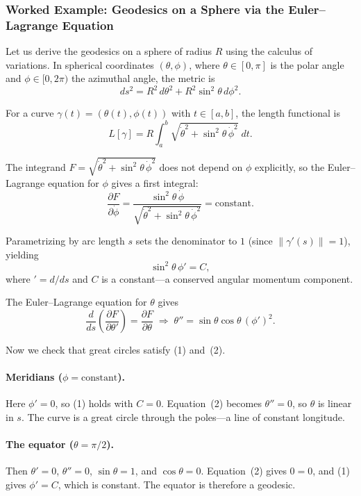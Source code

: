 \subsubsection*{Worked Example: Geodesics on a Sphere via the Euler--Lagrange Equation}

Let us derive the geodesics on a sphere of radius $R$ using the calculus of variations. In spherical coordinates $(\theta,\phi)$, where $\theta\in[0,\pi]$ is the polar angle and $\phi\in[0,2\pi)$ the azimuthal angle, the metric is
\[
ds^2 = R^2\,d\theta^2 + R^2\sin^2\theta\,d\phi^2.
\]

For a curve $\gamma(t)=(\theta(t),\phi(t))$ with $t\in[a,b]$, the length functional is
\[
L[\gamma] = R\int_a^b\sqrt{\dot\theta^2 + \sin^2\theta\,\dot\phi^2}\;dt.
\]

The integrand $F = \sqrt{\dot\theta^2 + \sin^2\theta\,\dot\phi^2}$ does not depend on $\phi$ explicitly, so the Euler--Lagrange equation for $\phi$ gives a first integral:
\[
\frac{\partial F}{\partial\dot\phi}
= \frac{\sin^2\theta\,\dot\phi}{\sqrt{\dot\theta^2 + \sin^2\theta\,\dot\phi^2}}
= \text{constant}.
\]

Parametrizing by arc length $s$ sets the denominator to $1$ (since $\|\gamma'(s)\|=1$), yielding
\[
\sin^2\theta\,\phi' = C,
\tag{1}
\]
where $'=d/ds$ and $C$ is a constant---a conserved angular momentum component.

The Euler--Lagrange equation for $\theta$ gives
\[
\frac{d}{ds}\!\left(\frac{\partial F}{\partial\theta'}\right) = \frac{\partial F}{\partial\theta}
\;\Longrightarrow\;
\theta'' = \sin\theta\cos\theta\,(\phi')^2.
\tag{2}
\]

Now we check that great circles satisfy (1) and~(2).

\paragraph{Meridians ($\phi = \text{constant}$).}
Here $\phi' = 0$, so (1) holds with $C=0$. Equation~(2) becomes $\theta'' = 0$, so $\theta$ is linear in $s$. The curve is a great circle through the poles---a line of constant longitude.

\paragraph{The equator ($\theta = \pi/2$).}
Then $\theta' = 0$, $\theta'' = 0$, $\sin\theta = 1$, and $\cos\theta = 0$. Equation~(2) gives $0 = 0$, and (1) gives $\phi' = C$, which is constant. The equator is therefore a geodesic.

